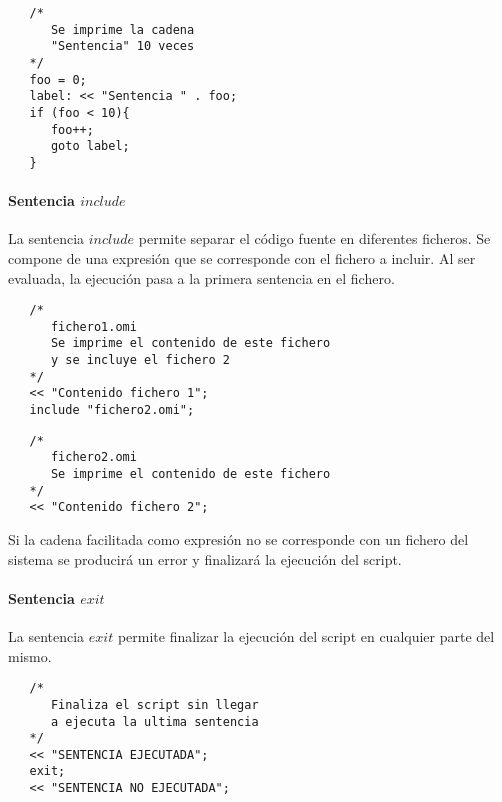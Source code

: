 \begin{lstlisting}
   /*
      Se imprime la cadena
      "Sentencia" 10 veces
   */
   foo = 0;
   label: << "Sentencia " . foo;
   if (foo < 10){
      foo++;
      goto label;
   }
\end{lstlisting}


\paragraph{Sentencia $include$} \label{sec:stmt_include}
La sentencia $include$ permite separar el código fuente en diferentes ficheros. Se compone de una 
expresión que se corresponde con el fichero a incluir. Al ser evaluada,
la ejecución pasa a la primera sentencia en el fichero. \\

\begin{lstlisting}
   /*
      fichero1.omi
      Se imprime el contenido de este fichero
      y se incluye el fichero 2
   */
   << "Contenido fichero 1";
   include "fichero2.omi";
\end{lstlisting}

\begin{lstlisting}
   /*
      fichero2.omi
      Se imprime el contenido de este fichero
   */
   << "Contenido fichero 2";
\end{lstlisting}

Si la cadena facilitada como expresión no se corresponde con un fichero del sistema
se producirá un error y finalizará la ejecución del script.

\paragraph{Sentencia $exit$} \label{sec:stmt_exit}

La sentencia $exit$ permite finalizar la ejecución del script en cualquier parte del mismo. \\

\begin{lstlisting}
   /*
      Finaliza el script sin llegar 
      a ejecuta la ultima sentencia
   */
   << "SENTENCIA EJECUTADA";
   exit;
   << "SENTENCIA NO EJECUTADA";
\end{lstlisting}

